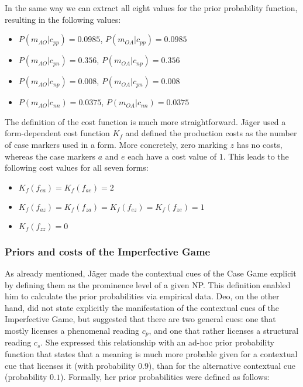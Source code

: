 \documentclass[output=paper,hidelinks]{langscibook}
\begin{document}
In the same way we can extract all eight values for the prior probability function, resulting in the following values:

\begin{itemize}
\item $P(m_{AO}|c_{pp}) = 0.0985$, $P(m_{OA}|c_{pp}) = 0.0985$
\item $P(m_{AO}|c_{pn}) = 0.356$, $P(m_{OA}|c_{np}) = 0.356$
\item $P(m_{AO}|c_{np}) = 0.008$, $P(m_{OA}|c_{pn}) = 0.008$
\item $P(m_{AO}|c_{nn}) = 0.0375$, $P(m_{OA}|c_{nn}) = 0.0375$
\end{itemize}

The definition of the cost function is much more straightforward.  Jäger used a form-dependent cost function $K_f$ and defined the production costs as the number of case markers used in  a form. More concretely, zero marking $z$ has no costs, whereas the case markers $a$ and $e$ each have a cost value of $1$. This leads to the following cost values for all seven forms:

\begin{itemize}
\item $K_f(f_{ea}) = K_f(f_{ae})  = 2$
\item $K_f(f_{az}) = K_f(f_{za}) = K_f(f_{ez}) = K_f(f_{ze}) = 1$
\item $K_f(f_{zz}) = 0$
\end{itemize}

\subsubsection{Priors and costs of the Imperfective Game}

As already mentioned, Jäger made the contextual cues of the Case Game explicit by defining them  as the prominence level of a given NP. This definition enabled him to calculate the prior probabilities via empirical data. Deo, on the other hand, did not state explicitly the manifestation of the contextual cues of the Imperfective Game, but suggested that there are two general cues: one that mostly licenses a phenomenal reading $c_p$, and one that rather licenses a structural reading $c_s$. She expressed this relationship with an ad-hoc prior probability function that states that a meaning is much more probable given for a contextual cue that licenses it (with probability $0.9$), than for the alternative contextual cue (probability $0.1$). Formally, her prior probabilities were defined as follows:
\end{document}

